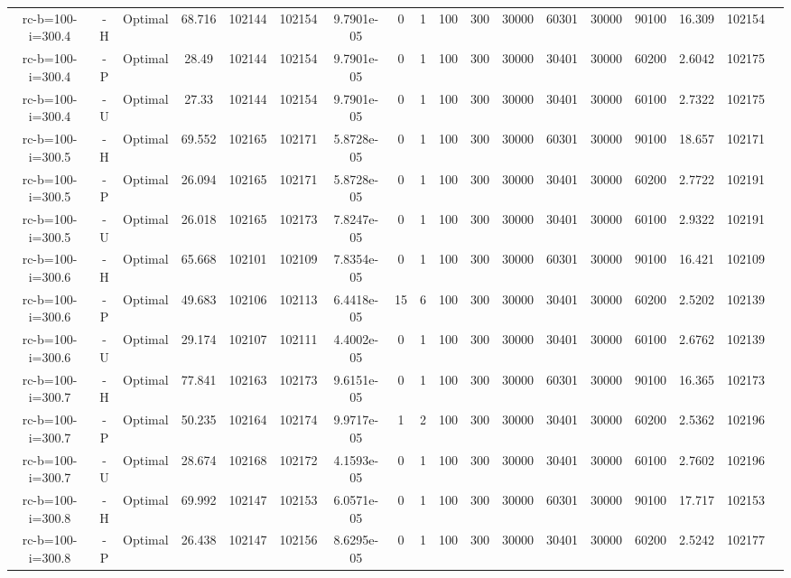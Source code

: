 \documentclass[landscape, a4paper]{article}
\begin{document}
\begin{center}
\begin{tabular}{@{}cccccccccccccccccc@{}}
rc-b=100-i=300.4 & -H & Optimal & 68.716 & 102144 & 102154 & 9.7901e-05 & 0 & 1 & 100 & 300 & 30000 & 60301 & 30000 & 90100 & 16.309 & 102154 & \\
rc-b=100-i=300.4 & -P & Optimal & 28.49 & 102144 & 102154 & 9.7901e-05 & 0 & 1 & 100 & 300 & 30000 & 30401 & 30000 & 60200 & 2.6042 & 102175 & \\
rc-b=100-i=300.4 & -U & Optimal & 27.33 & 102144 & 102154 & 9.7901e-05 & 0 & 1 & 100 & 300 & 30000 & 30401 & 30000 & 60100 & 2.7322 & 102175 & \\
rc-b=100-i=300.5 & -H & Optimal & 69.552 & 102165 & 102171 & 5.8728e-05 & 0 & 1 & 100 & 300 & 30000 & 60301 & 30000 & 90100 & 18.657 & 102171 & \\
rc-b=100-i=300.5 & -P & Optimal & 26.094 & 102165 & 102171 & 5.8728e-05 & 0 & 1 & 100 & 300 & 30000 & 30401 & 30000 & 60200 & 2.7722 & 102191 & \\
rc-b=100-i=300.5 & -U & Optimal & 26.018 & 102165 & 102173 & 7.8247e-05 & 0 & 1 & 100 & 300 & 30000 & 30401 & 30000 & 60100 & 2.9322 & 102191 & \\
rc-b=100-i=300.6 & -H & Optimal & 65.668 & 102101 & 102109 & 7.8354e-05 & 0 & 1 & 100 & 300 & 30000 & 60301 & 30000 & 90100 & 16.421 & 102109 & \\
rc-b=100-i=300.6 & -P & Optimal & 49.683 & 102106 & 102113 & 6.4418e-05 & 15 & 6 & 100 & 300 & 30000 & 30401 & 30000 & 60200 & 2.5202 & 102139 & \\
rc-b=100-i=300.6 & -U & Optimal & 29.174 & 102107 & 102111 & 4.4002e-05 & 0 & 1 & 100 & 300 & 30000 & 30401 & 30000 & 60100 & 2.6762 & 102139 & \\
rc-b=100-i=300.7 & -H & Optimal & 77.841 & 102163 & 102173 & 9.6151e-05 & 0 & 1 & 100 & 300 & 30000 & 60301 & 30000 & 90100 & 16.365 & 102173 & \\
rc-b=100-i=300.7 & -P & Optimal & 50.235 & 102164 & 102174 & 9.9717e-05 & 1 & 2 & 100 & 300 & 30000 & 30401 & 30000 & 60200 & 2.5362 & 102196 & \\
rc-b=100-i=300.7 & -U & Optimal & 28.674 & 102168 & 102172 & 4.1593e-05 & 0 & 1 & 100 & 300 & 30000 & 30401 & 30000 & 60100 & 2.7602 & 102196 & \\
rc-b=100-i=300.8 & -H & Optimal & 69.992 & 102147 & 102153 & 6.0571e-05 & 0 & 1 & 100 & 300 & 30000 & 60301 & 30000 & 90100 & 17.717 & 102153 & \\
rc-b=100-i=300.8 & -P & Optimal & 26.438 & 102147 & 102156 & 8.6295e-05 & 0 & 1 & 100 & 300 & 30000 & 30401 & 30000 & 60200 & 2.5242 & 102177 & \\

\end{tabular}
\end{center}
\end{document}
